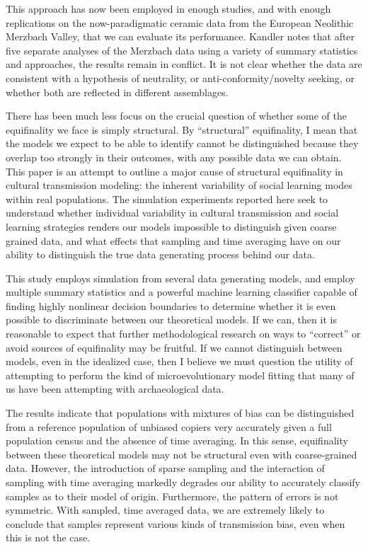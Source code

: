 This approach has now been employed in enough studies, and with enough replications on the now-paradigmatic ceramic data from the European Neolithic Merzbach Valley, that we can evaluate its performance.  Kandler \citeyearpar{Kandler20150905} notes that after five separate analyses of the Merzbach data using a variety of summary statistics and approaches, the results remain in conflict.  It is not clear whether the data are consistent with a hypothesis of neutrality, or anti-conformity/novelty seeking, or whether both are reflected in different assemblages.  

There has been much less focus on the crucial question of whether some of the equifinality we face is simply structural.  By ``structural'' equifinality, I mean that the models we expect to be able to identify cannot be distinguished because they overlap too strongly in their outcomes, with any possible data we can obtain.  This paper is an attempt to outline a major cause of structural equifinality in cultural transmission modeling:  the inherent variability of social learning modes within real populations.  The simulation experiments reported here seek to understand whether individual variability in cultural transmission and social learning strategies renders our models impossible to distinguish given coarse grained data, and what effects that sampling and time averaging have on our ability to distinguish the true data generating process behind our data.

This study employs simulation from several data generating models, and employ multiple summary statistics and a powerful machine learning classifier capable of finding highly nonlinear decision boundaries to determine whether it is even possible to discriminate between our theoretical models.  If we can, then it is reasonable to expect that further methodological research on ways to ``correct'' or avoid sources of equifinality may be fruitful.  If we cannot distinguish between models, even in the idealized case, then I believe we must question the utility of attempting to perform the kind of microevolutionary model fitting that many of us have been attempting with archaeological data.  

The results indicate that populations with mixtures of bias can be distinguished from a reference population of unbiased copiers very accurately given a full population census and the absence of time averaging.  In this sense, equifinality between these theoretical models may not be structural even with coarse-grained data.  However, the introduction of sparse sampling and the interaction of sampling with time averaging markedly degrades our ability to accurately classify samples as to their model of origin.  Furthermore, the pattern of errors is not symmetric.  With sampled, time averaged data, we are extremely likely to conclude that samples represent various kinds of transmission bias, even when this is not the case.  


